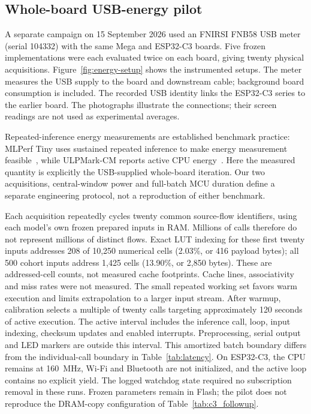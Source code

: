 \subsection{Whole-board USB-energy pilot}
\label{sec:energy-pilots}
A separate campaign on 15 September 2026 used an FNIRSI FNB58 USB meter (serial 104332) with the same Mega and ESP32-C3 boards. Five frozen implementations were each evaluated twice on each board, giving twenty physical acquisitions. Figure~\ref{fig:energy-setup} shows the instrumented setups. The meter measures the USB supply to the board and downstream cable; background board consumption is included. The recorded USB identity links the ESP32-C3 series to the earlier board. The photographs illustrate the connections; their screen readings are not used as experimental averages.



Repeated-inference energy measurements are established benchmark practice: MLPerf Tiny uses sustained repeated inference to make energy measurement feasible~\cite{Banbury2021MLPerfTiny}, while ULPMark-CM reports active CPU energy~\cite{EEMBCULPMarkCM}. Here the measured quantity is explicitly the USB-supplied whole-board iteration. Our two acquisitions, central-window power and full-batch MCU duration define a separate engineering protocol, not a reproduction of either benchmark.

Each acquisition repeatedly cycles twenty common source-flow identifiers, using each model's own frozen prepared inputs in RAM. Millions of calls therefore do not represent millions of distinct flows. Exact LUT indexing for these first twenty inputs addresses 208 of 10,250 numerical cells (2.03\%, or 416 payload bytes); all 500 cohort inputs address 1,425 cells (13.90\%, or 2,850 bytes). These are addressed-cell counts, not measured cache footprints. Cache lines, associativity and miss rates were not measured. The small repeated working set favors warm execution and limits extrapolation to a larger input stream. After warmup, calibration selects a multiple of twenty calls targeting approximately 120 seconds of active execution. The active interval includes the inference call, loop, input indexing, checksum updates and enabled interrupts. Preprocessing, serial output and LED markers are outside this interval. This amortized batch boundary differs from the individual-call boundary in Table~\ref{tab:latency}. On ESP32-C3, the CPU remains at 160~MHz, Wi-Fi and Bluetooth are not initialized, and the active loop contains no explicit yield. The logged watchdog state required no subscription removal in these runs. Frozen parameters remain in Flash; the pilot does not reproduce the DRAM-copy configuration of Table~\ref{tab:c3_followup}.

